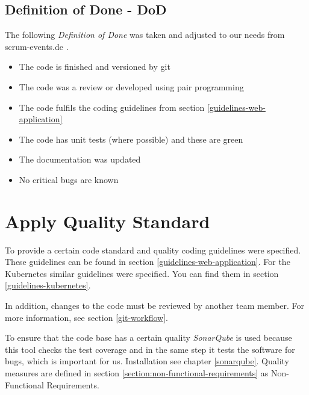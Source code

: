 \subsection{Definition of Done - DoD}
The following \textit{Definition of Done} was taken and adjusted to our needs from scrum-events.de \cite{www.scrum-events.de_dod}.
\begin{itemize}
  \item The code is finished and versioned by git
  \item The code was a review or developed using pair programming
  \item The code fulfils the coding guidelines from section \ref{guidelines-web-application}
  \item The code has unit tests (where possible) and these are green
  \item The documentation was updated
  \item No critical bugs are known
\end{itemize}

\section{Apply Quality Standard}
To provide a certain code standard and quality coding guidelines were specified.
These guidelines can be found in section \ref{guidelines-web-application}.
For the Kubernetes similar guidelines were specified.
You can find them in section \ref{guidelines-kubernetes}.

In addition, changes to the code must be reviewed by another team member.
For more information, see section \ref{git-workflow}.

To ensure that the code base has a certain quality \textit{SonarQube} is used because this tool checks the test coverage and in the same step it tests the software for bugs, which is important for us.
Installation see chapter \ref{sonarqube}.
Quality measures are defined in section \ref{section:non-functional-requirements} as Non-Functional Requirements.